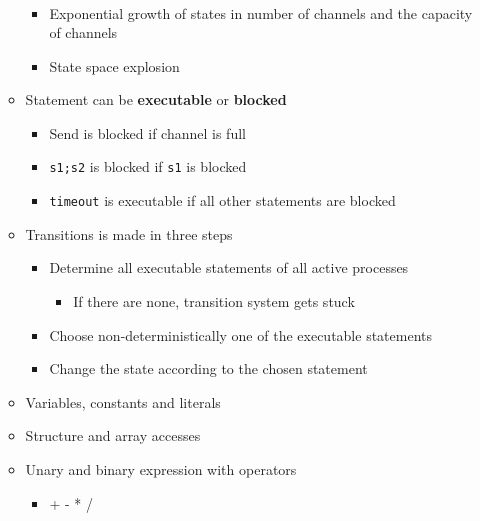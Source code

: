 \begin{itemize}
\begin{itemize}
\begin{itemize}
\begin{align*}
                        \end{align*}
                    \item Exponential growth of states in number of channels and the capacity of channels
                    \item State space explosion
                \end{itemize}
        \end{itemize}
        \begin{itemize}
            \item Statement can be \textbf{executable} or \textbf{blocked}
                \begin{itemize}
                    \item Send is blocked if channel is full
                    \item \verb+s1;s2+ is blocked if \verb+s1+ is blocked
                    \item \verb+timeout+ is executable if all other statements are blocked
                \end{itemize}
            \item Transitions is made in three steps
                \begin{itemize}
                    \item Determine all executable statements of all active processes
                        \begin{itemize}
                            \item If there are none, transition system gets stuck
                        \end{itemize}
                    \item Choose non-deterministically one of the executable statements
                    \item Change the state according to the chosen statement
                \end{itemize}
        \end{itemize}
        \begin{itemize}
            \item Variables, constants and literals
            \item Structure and array accesses
            \item Unary and binary expression with operators
                \begin{itemize}
                    \item \verb@+ - * / % > >= < <= == != ! & || && | ~ >> << ^ ++ --@

\end{itemize}
\end{itemize}
\end{itemize}

